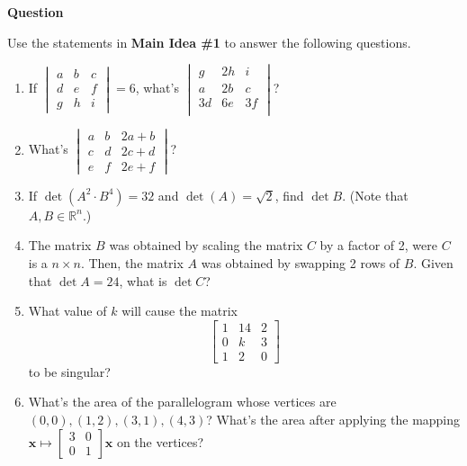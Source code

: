 \documentclass[titlepage, a4paper, 10pt]{article}
\renewcommand{\vec}[1]{\bm{#1}}
\newcounter{question}
\newenvironment{newquestion}
{
	\noindent\textbf{Question \thequestion}
}
{
\stepcounter{question}
\par
}
\begin{document}
    \begin{newquestion}
        Use the statements in
        \textbf{Main Idea \#1} to answer the 
        following questions.

        \begin{enumerate}
            \item If \(
                \begin{vmatrix}
                    a & b & c \\
                    d & e & f \\
                    g & h & i
                \end{vmatrix} = 6
                \), what's \(
                \begin{vmatrix}
                    g &  2h & i \\
                    a &  2b & c \\
                    3d & 6e & 3f \\
                \end{vmatrix}
                \)?
            \item What's 
                \(\begin{vmatrix}
                    a & b & 2a + b \\
                    c & d & 2c + d \\
                    e & f & 2e + f
            \end{vmatrix}\)?
	    \item If \(\det(A^2 \cdot B^4) = 32\) and  \(\det(A) = \sqrt{2}\), find \(\det B\). (Note that \(A, B \in \mathbb{R}^n\).)
	    \item The matrix \(B\) was obtained by scaling the matrix \(C\) by a factor of 2, were \(C\) is a \(n \times n\). Then, the matrix \(A\) was obtained by
		     swapping 2 rows of \(B\). Given that \(\det A = 24\), what is \(\det C\)?
	    \item What value of \(k\) will cause the matrix \[\begin{bmatrix}1 & 14 & 2 \\ 0 & k & 3 \\ 1 & 2 & 0\end{bmatrix}\] to be singular?
            \item[\textbf{*}] What's the area of the 
                  parallelogram whose vertices 
                  are \((0, 0), (1, 2), (3, 1), (4, 3)\)? What's the area after
                  applying the mapping \(\vec{x} \mapsto \begin{bmatrix}
                      3 & 0 \\ 0 & 1
                  \end{bmatrix}\vec{x}\) on
                  the vertices?
        \end{enumerate}
    \end{newquestion}


\end{document}
